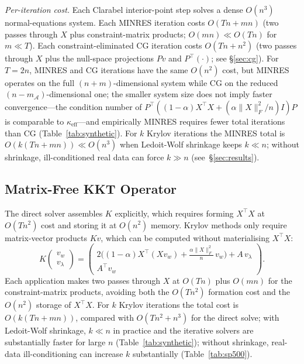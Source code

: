 \documentclass{siam/siamart}
\begin{document}
\textit{Per-iteration cost.}  Each Clarabel interior-point step solves a
dense $O(n^3)$ normal-equations system.  Each MINRES iteration costs $O(Tn + mn)$
(two passes through $X$ plus constraint-matrix products; $O(mn) \ll O(Tn)$ for $m \ll T$).
Each constraint-eliminated CG iteration costs $O(Tn + n^2)$ (two passes through $X$ plus the
null-space projections $Pv$ and $P^\top(\cdot)$; see \S\ref{sec:cg}).  For $T = 2n$,
MINRES and CG iterations have the same $O(n^2)$ cost, but MINRES operates on the
full $(n+m)$-dimensional system while CG on the reduced $(n - m_\mathcal{A})$-dimensional
one; the smaller system size does not imply faster convergence---the condition number
of $P^\top((1-\alpha)X^\top X + (\alpha\|X\|_F^2/n)I)P$ is comparable to $\kappa_\mathrm{eff}$---and
empirically MINRES requires fewer total iterations than CG (Table~\ref{tab:synthetic}).
For $k$ Krylov iterations the MINRES total
is $O(k(Tn + mn)) \ll O(n^3)$ when Ledoit-Wolf shrinkage keeps $k \ll n$; without
shrinkage, ill-conditioned real data can force $k \gg n$ (see~\S\ref{sec:results}).

\subsection{Matrix-Free KKT Operator}\label{sec:matfree}

The direct solver assembles $K$ explicitly, which requires forming $X^\top X$
at $O(Tn^2)$ cost and storing it at $O(n^2)$ memory.  Krylov methods only
require matrix-vector products $Kv$, which can be computed without
materialising $X^\top X$:
\[
  K \begin{pmatrix} v_w \\ v_\lambda \end{pmatrix}
  =
  \begin{pmatrix}
    2\bigl((1-\alpha)X^\top(X v_w) + \tfrac{\alpha\|X\|_F^2}{n}\, v_w\bigr) + A\, v_\lambda \\
    A^\top v_w
  \end{pmatrix}.
\]
Each application makes two passes through $X$ at $O(Tn)$ plus $O(mn)$ for the
constraint-matrix products, avoiding both the $O(Tn^2)$ formation cost and the
$O(n^2)$ storage of $X^\top X$.  For $k$ Krylov iterations the total cost is
$O(k(Tn + mn))$, compared with $O(Tn^2 + n^3)$ for the direct solve; with
Ledoit-Wolf shrinkage, $k \ll n$ in practice and the iterative solvers are
substantially faster for large $n$ (Table~\ref{tab:synthetic}); without shrinkage,
real-data ill-conditioning can increase $k$ substantially (Table~\ref{tab:sp500}).
\end{document}
